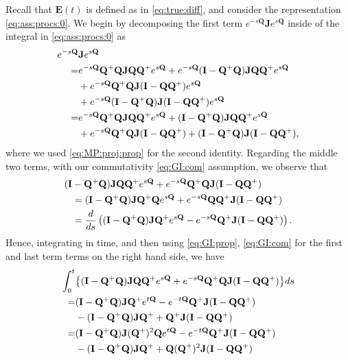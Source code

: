 \documentclass[9pt,twocolumn,twoside]{pnas-new}
\newcommand{\?}{\textbf{?}}
\newcommand{\QQ}{\mathbf{Q}}
\newcommand{\JJ}{\mathbf{J}}
\newcommand{\II}{\mathbf{I}}
\newcommand{\Z}{\mathbf{E}}
\begin{document}
Recall that $\Z(t)$ is defined as in \eqref{eq:true:diff}, and
consider the representation \eqref{eq:ass:procs:0}. We begin by
decomposing the first term $e^{-s\QQ} \JJ e^{s \QQ}$ inside of the
integral in \eqref{eq:ass:procs:0} as
\begin{align}
  e^{-s\QQ} &\JJ e^{s \QQ} \notag\\
  =&e^{-s\QQ} \QQ^+ \QQ \JJ \QQ \QQ^{+} e^{s\QQ}
     + e^{-s\QQ} (\II -\QQ^+ \QQ) \JJ \QQ \QQ^{+} e^{s\QQ}
                  \notag\\
      &+ e^{-s\QQ}\QQ^+ \QQ \JJ (\II - \QQ \QQ^{+}) e^{s\QQ}
                \notag\\
       &+e^{-s\QQ} (\II -\QQ^+ \QQ) \JJ (\II -\QQ \QQ^{+}) e^{s\QQ}
                           \notag\\
  = &e^{-s\QQ} \QQ^+ \QQ \JJ \QQ \QQ^{+} e^{s\QQ}
      + (\II -\QQ^+ \QQ) \JJ \QQ \QQ^{+} e^{s\QQ}
         \label{eq:big:yuck:1}                          
      \\
      &+ e^{-s\QQ}\QQ^+ \QQ \JJ (\II - \QQ \QQ^{+})
  + (\II -\QQ^+ \QQ) \JJ (\II -\QQ \QQ^{+}),
  \notag
\end{align}
where we used \eqref{eq:MP:proj:prop} for the second identity.
Regarding the middle two terms, with our commutativity
\eqref{eq:GI:com} assumption, we observe that
\begin{align}
  (\II &-\QQ^+ \QQ) \JJ \QQ \QQ^{+} e^{s\QQ}
         + e^{-s\QQ}\QQ^+ \QQ \JJ (\II - \QQ \QQ^{+})
                \label{eq:big:yuck:2}                          
                     \\
  &=  (\II -\QQ^+ \QQ) \JJ \QQ^{+} \QQ e^{s\QQ}
    + e^{-s\QQ}\QQ \QQ^+ \JJ (\II - \QQ \QQ^{+})
    \notag\\
  &= \frac{d}{ds}
    \left(
    (\II -\QQ^+ \QQ) \JJ \QQ^{+} e^{s\QQ}
    - e^{-s\QQ} \QQ^+ \JJ (\II - \QQ \QQ^{+})
    \right).
 \notag
\end{align}
Hence, integrating in time, and then using \eqref{eq:GI:prop},
\eqref{eq:GI:com} for the first and last term terms on the right hand side, we have
\begin{align}
  \int_0^t& \big\{(\II -\QQ^+ \QQ) \JJ \QQ \QQ^{+} e^{s\QQ}
                             + e^{-s\QQ}\QQ^+ \QQ \JJ (\II - \QQ \QQ^{+})\big\}ds
                             \notag\\
   =& (\II -\QQ^+ \QQ) \JJ \QQ^{+}e^{t\QQ}
      - e^{-t\QQ} \QQ^+ \JJ (\II - \QQ \QQ^{+})
      \notag\\
    &- (\II -\QQ^+ \QQ) \JJ \QQ^{+} 
      +  \QQ^+ \JJ (\II - \QQ \QQ^{+})
      \notag\\
   =& (\II -\QQ^+ \QQ) \JJ (\QQ^+)^2 \QQ e^{t\QQ}
      - e^{-t\QQ} \QQ^+ \JJ (\II - \QQ \QQ^{+})
      \notag\\
    &- (\II -\QQ^+ \QQ) \JJ \QQ^{+} 
      + \QQ (\QQ^+)^2 \JJ (\II - \QQ \QQ^{+})
             \label{eq:big:yuck:3}                          
\end{align}
\end{document}
